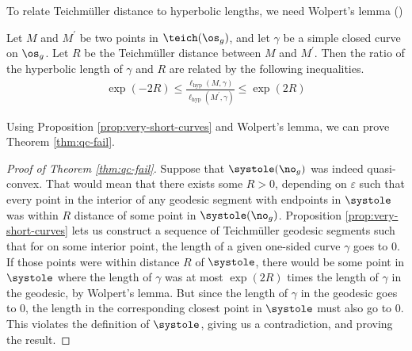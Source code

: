 \documentclass[12pt, reqno]{amsart}
\begin{document}
To relate Teichm\"uller distance to hyperbolic lengths, we need Wolpert's lemma (\autocite{wolpert1979length})
\begin{lemma}
  Let $M$ and $M^{\prime}$ be two points in $\teich(\os_g)$, and let $\gamma$ be a simple closed curve on $\os_g$.
  Let $R$ be the Teichm\"uller distance between $M$ and $M^{\prime}$. Then the ratio of the hyperbolic length
  of $\gamma$ and $R$ are related by the following inequalities.
  \begin{align*}
    \exp(-2R) \leq \frac{\ell_{\mathrm{hyp}}(M, \gamma)}{\ell_{\mathrm{hyp}}(M^{\prime}, \gamma)} \leq \exp(2R)
  \end{align*}
\end{lemma}

Using Proposition \ref{prop:very-short-curves} and Wolpert's lemma, we can prove Theorem
\ref{thm:qc-fail}.
\begin{proof}[Proof of Theorem \ref{thm:qc-fail}]
  Suppose that $\systole(\no_g)$ was indeed quasi-convex.
  That would mean that there exists some $R > 0$, depending on $\varepsilon$ such that every point in the interior of any geodesic segment with endpoints in $\systole$ was within $R$
  distance of some point in $\systole(\no_g)$.
  Proposition \ref{prop:very-short-curves} lets us construct a sequence of Teichmüller geodesic segments such that for on some interior point, the length of a given one-sided curve $\gamma$ goes to $0$.
  If those points were within distance $R$ of $\systole$, there would be some point in $\systole$ where the length of $\gamma$ was at most $\exp(2R)$ times the length of $\gamma$ in the geodesic, by Wolpert's lemma.
  But since the length of $\gamma$ in the geodesic goes to $0$, the length in the corresponding closest point in $\systole$ must also go to $0$.
  This violates the definition of $\systole$, giving us a contradiction, and proving the result.
\end{proof}

\printbibliography
\end{document}
